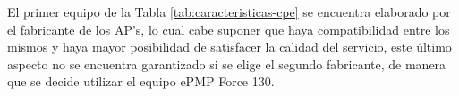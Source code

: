 El primer equipo de la Tabla \ref{tab:caracteristicas-cpe} se encuentra elaborado por el fabricante de los AP's, lo cual cabe suponer que haya compatibilidad entre los mismos y haya mayor posibilidad de satisfacer la calidad del servicio, este último aspecto no se encuentra garantizado si se elige el segundo fabricante, de manera que se decide utilizar el equipo ePMP Force 130.